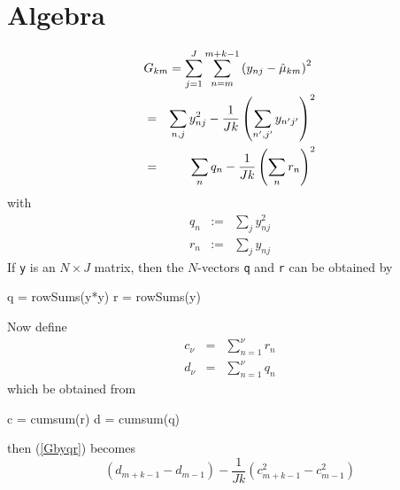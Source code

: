 \documentclass[11pt]{article}
\begin{document}
\section{Algebra}
\begin{eqnarray}
\lefteqn{G_{km} = \sum_{j=1}^J \sum_{n=m}^{m+k-1} 
\left(y_{nj} - \hat{\mu}_{km} \right)^2} \\
%
&=& \sum_{n,j} y_{nj}^2 - \frac{1}{Jk} \left(\sum_{n',j'} y_{n'j'}\right)^2 \\
%
&=& \sum_n q_n - \frac{1}{Jk}\left(\sum_n r_n\right)^2 \label{Gbyqr}
\end{eqnarray}
with
\begin{eqnarray}
q_n&:=&\sum_j  y_{nj}^2 \\
r_n&:=&\sum_j  y_{nj} 
\end{eqnarray}
If \texttt{y} is an $N\times J$ matrix, then the $N$-vectors \texttt{q} 
and \texttt{r} can be obtained by
\begin{Sinput}
q = rowSums(y*y)
r = rowSums(y) 
\end{Sinput}
Now define
\begin{eqnarray}
c_\nu &=& \sum_{n=1}^{\nu}r_n\\
d_\nu &=& \sum_{n=1}^{\nu}q_n
\end{eqnarray}
which be obtained from
\begin{Sinput}
c = cumsum(r) 
d = cumsum(q) 
\end{Sinput}
then (\ref{Gbyqr}) becomes
\begin{equation}
(d_{m+k-1}-d_{m-1}) - 
\frac{1}{Jk}(c_{m+k-1}^2-c_{m-1}^2)
\end{equation}





\end{document}
